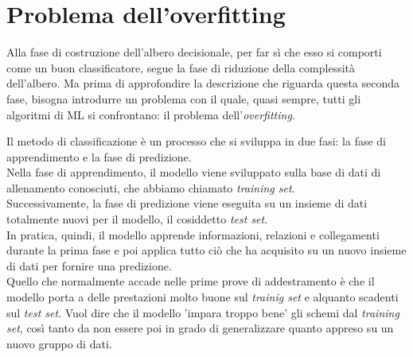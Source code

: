 \section{Problema dell'overfitting}
\label{sec:overfitting}
Alla fase di costruzione dell'albero decisionale, per far sì che esso si comporti come un buon classificatore, segue la fase di riduzione della complessità dell'albero. Ma prima di approfondire la descrizione che riguarda questa seconda fase, bisogna introdurre un problema con il quale, quasi sempre, tutti gli algoritmi di ML si confrontano: il problema dell'\textit{overfitting}.

Il metodo di classificazione è un processo che si sviluppa in due fasi: la fase di apprendimento e la fase di predizione.\\ 
Nella fase di apprendimento, il modello viene sviluppato sulla base di dati di allenamento conosciuti, che abbiamo chiamato \textit{training set}.\\
Successivamente, la fase di predizione viene eseguita su un insieme di dati totalmente nuovi per il modello, il cosiddetto \textit{test set}.\\
In pratica, quindi, il modello apprende informazioni, relazioni e collegamenti durante la prima fase e poi applica tutto ciò che ha acquisito su un nuovo insieme di dati per fornire una predizione.\\
Quello che normalmente accade  nelle prime prove di addestramento è che il modello porta a delle prestazioni molto buone sul \textit{trainig set} e alquanto scadenti sul \textit{test set}. Vuol dire che il modello 'impara troppo bene' gli schemi dal \textit{training set}, così tanto da non essere poi in grado di generalizzare quanto appreso su un nuovo gruppo di dati.

